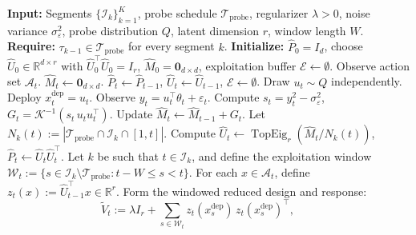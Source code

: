 \documentclass{article}
\newcommand{\R}{\mathbb{R}}
\newcommand{\cA}{\mathcal{A}}
\newcommand{\cI}{\mathcal{I}}
\newcommand{\cTprobe}{\mathcal{T}_{\mathrm{probe}}}
\DeclareMathOperator{\TopEig}{TopEig}
\begin{document}
\begin{algorithm}[!htpb]
  \caption{Single-Play Subspace-Aware Control with Windowed $r$-Dimensional Exploitation}
  \label{alg:single_play_control_rdim}
  \begin{algorithmic}[1]
  \State \textbf{Input:} Segments $\{\cI_k\}_{k=1}^K$, probe schedule $\cTprobe$,
         regularizer $\lambda > 0$, noise variance $\sigma_\varepsilon^2$,
         probe distribution $Q$, latent dimension $r$, window length $W$.
  \State \textbf{Require:} $\tau_{k-1} \in \cTprobe$ for every segment $k$.
  \State \textbf{Initialize:} $\widehat P_0 = I_d$, choose $\widehat U_0 \in \R^{d\times r}$
         with $\widehat U_0^\top \widehat U_0 = I_r$, $\widehat M_0 = \mathbf{0}_{d\times d}$,
         exploitation buffer $\mathcal{E} \leftarrow \emptyset$.
      \State Observe action set $\cA_t$.
          \State $\widehat M_t \leftarrow \mathbf{0}_{d\times d}$.
          \State $\widehat P_t \leftarrow \widehat P_{t-1}$,\quad
                 $\widehat U_t \leftarrow \widehat U_{t-1}$,\quad
                 $\mathcal{E} \leftarrow \emptyset$.
      \EndIf
      \If{$t \in \cTprobe$}
          \State Draw $u_t \sim Q$ independently.
          \State Deploy $x_t^{\mathrm{dep}} = u_t$.
          \State Observe $y_t = u_t^\top \theta_t + \varepsilon_t$.
          \State Compute
                 $s_t = y_t^2 - \sigma_\varepsilon^2$, \quad
                 $G_t = \mathcal K^{-1}(s_t\, u_t u_t^\top)$.
          \State Update $\widehat M_t \leftarrow \widehat M_{t-1} + G_t$.
          \State Let $N_k(t) := |\cTprobe \cap \cI_k \cap [1,t]|$.
          \State Compute
                 $\widehat U_t \leftarrow \TopEig_r(\widehat M_t / N_k(t))$, \quad
                 $\widehat P_t \leftarrow \widehat U_t \widehat U_t^\top$.
      \Else
          \State Let $k$ be such that $t \in \cI_k$, and define the exploitation window
                 $\mathcal W_t := \{s \in \cI_k \setminus \cTprobe : t-W \le s < t\}$.
          \State For each $x \in \cA_t$, define
                 $z_t(x) := \widehat U_{t-1}^\top x \in \R^r$.
          \State Form the windowed reduced design and response:
          \[
              \widetilde V_t
              :=
              \lambda I_r
              + \sum_{s\in\mathcal W_t}
                z_t(x_s^{\mathrm{dep}})\, z_t(x_s^{\mathrm{dep}})^\top,
              \qquad
\]
\end{algorithmic}
\end{algorithm}
\end{document}
